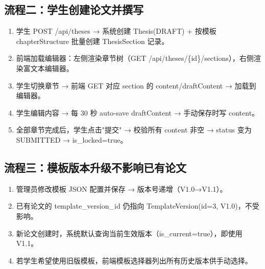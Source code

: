 \subsection{流程二：学生创建论文并撰写}

\begin{enumerate}
    \item 学生 POST /api/theses → 系统创建 Thesis(DRAFT) + 按模板 chapterStructure 批量创建 ThesisSection 记录。
    \item 前端加载编辑器：左侧渲染章节树（GET /api/theses/\{id\}/sections），右侧渲染富文本编辑器。
    \item 学生切换章节 → 前端 GET 对应 section 的 content/draftContent → 加载到编辑器。
    \item 学生编辑内容 → 每 30 秒 auto-save draftContent → 手动保存时写 content。
    \item 全部章节完成后，学生点击"提交" → 校验所有 content 非空 → status 变为 SUBMITTED → is\_locked=true。
\end{enumerate}

\subsection{流程三：模板版本升级不影响已有论文}

\begin{enumerate}
    \item 管理员修改模板 JSON 配置并保存 → 版本号递增（V1.0→V1.1）。
    \item 已有论文的 template\_version\_id 仍指向 TemplateVersion(id=3, V1.0)，不受影响。
    \item 新论文创建时，系统默认查询当前生效版本（is\_current=true），即使用 V1.1。
    \item 若学生希望使用旧版模板，前端模板选择器列出所有历史版本供手动选择。
\end{enumerate}
